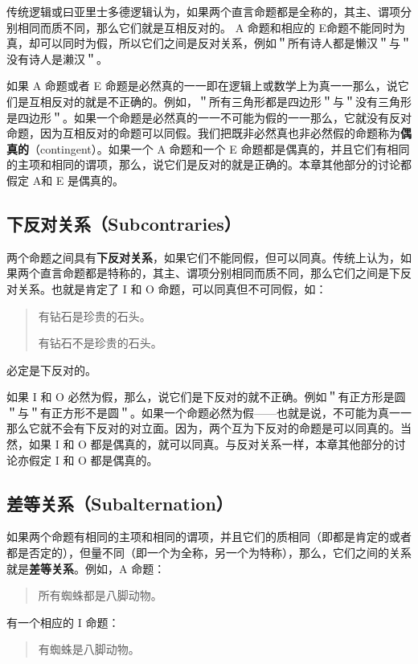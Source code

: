 传统逻辑或曰亚里士多德逻辑认为，如果两个直言命题都是全称的，其主、谓项分别相同而质不同，那么它们就是互相反对的。\cite{kneale1962} A 命题和相应的 E命题不能同时为真，却可以同时为假，所以它们之间是反对关系，例如＂所有诗人都是懒汉＂与＂没有诗人是濑汉＂。

如果 A 命题或者 E 命题是必然真的一一即在逻辑上或数学上为真一一那么，说它们是互相反对的就是不正确的。例如，＂所有三角形都是四边形＂与＂没有三角形是四边形＂。如果一个命题是必然真的一一不可能为假的一一那么，它就没有反对命题，因为互相反对的命题可以同假。我们把既非必然真也非必然假的命题称为\textbf{偶真的}（contingent）。如果一个 A 命题和一个 E 命题都是偶真的，并且它们有相同的主项和相同的谓项，那么，说它们是反对的就是正确的。本章其他部分的讨论都假定 A和 E 是偶真的。

\subsection{下反对关系（Subcontraries）}
两个命题之间具有\textbf{下反对关系}，如果它们不能同假，但可以同真。传统上认为，如果两个直言命题都是特称的，其主、谓项分别相同而质不同，那么它们之间是下反对关系。也就是肯定了 I 和 O 命题，可以同真但不可同假，如：

\begin{quote}
有钻石是珍贵的石头。

有钻石不是珍贵的石头。
\end{quote}

必定是下反对的。

如果 I 和 O 必然为假，那么，说它们是下反对的就不正确。例如＂有正方形是圆＂与＂有正方形不是圆＂。如果一个命题必然为假——也就是说，不可能为真一一那么它就不会有下反对的对立面。因为，两个互为下反对的命题是可以同真的。当然，如果 I 和 O 都是偶真的，就可以同真。与反对关系一样，本章其他部分的讨论亦假定 I 和 O 都是偶真的。

\subsection{差等关系（Subalternation）}
如果两个命题有相同的主项和相同的谓项，并且它们的质相同（即都是肯定的或者都是否定的），但量不同（即一个为全称，另一个为特称），那么，它们之间的关系就是\textbf{差等关系}。例如，A 命题：

\begin{quote}
所有蜘蛛都是八脚动物。
\end{quote}

有一个相应的 I 命题：

\begin{quote}
有蜘蛛是八脚动物。
\end{quote}

